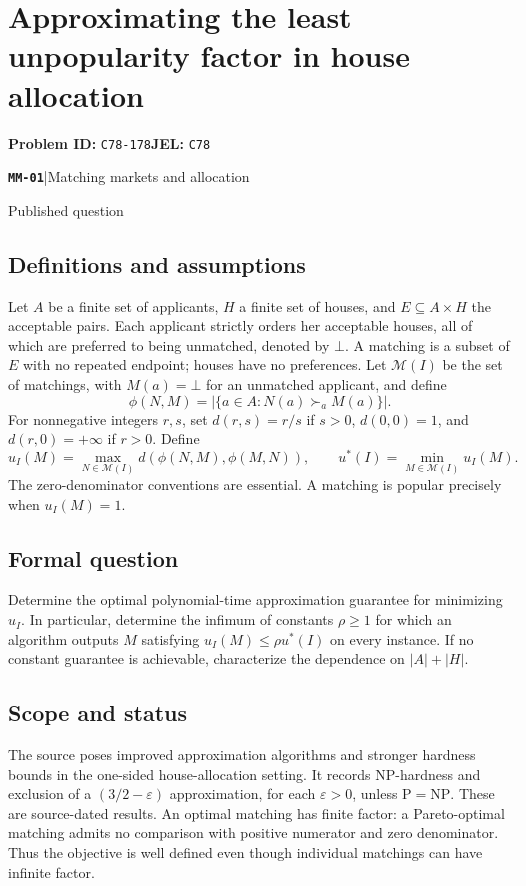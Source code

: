 \documentclass[11pt,a4paper]{article}
\newcommand{\entrymeta}[3]{{\sffamily\small\color{muted}\textbf{\texttt{#1}}\quad|\quad #2\par #3\par}}
\begin{document}
\section*{Approximating the least unpopularity factor in house allocation}
\textbf{Problem ID:} \texttt{C78-178}\quad \textbf{JEL:} \texttt{C78}\par
\label{problem:OP-0542}
\label{beyond:MM-01}
\entrymeta{MM-01}{Matching markets and allocation}{Published question}
\subsection*{Definitions and assumptions}
Let $A$ be a finite set of applicants, $H$ a finite set of houses, and $E\subseteq A\times H$ the acceptable pairs. Each applicant strictly orders her acceptable houses, all of which are preferred to being unmatched, denoted by $\bot$. A matching is a subset of $E$ with no repeated endpoint; houses have no preferences. Let $\mathcal M(I)$ be the set of matchings, with $M(a)=\bot$ for an unmatched applicant, and define
\[
 \phi(N,M)=|\{a\in A:N(a)\succ_a M(a)\}|.
\]
For nonnegative integers $r,s$, set $d(r,s)=r/s$ if $s>0$, $d(0,0)=1$, and $d(r,0)=+\infty$ if $r>0$. Define
\[
 u_I(M)=\max_{N\in\mathcal M(I)}d(\phi(N,M),\phi(M,N)),\qquad
 u^*(I)=\min_{M\in\mathcal M(I)}u_I(M).
\]
The zero-denominator conventions are essential. A matching is popular precisely when $u_I(M)=1$.
\subsection*{Formal question}
Determine the optimal polynomial-time approximation guarantee for minimizing $u_I$. In particular, determine the infimum of constants $\rho\ge1$ for which an algorithm outputs $M$ satisfying $u_I(M)\le\rho u^*(I)$ on every instance. If no constant guarantee is achievable, characterize the dependence on $|A|+|H|$.
\subsection*{Scope and status}
The source poses improved approximation algorithms and stronger hardness bounds in the one-sided house-allocation setting. It records NP-hardness and exclusion of a $(3/2-\varepsilon)$ approximation, for each $\varepsilon>0$, unless $\mathrm P=\mathrm{NP}$. These are source-dated results. An optimal matching has finite factor: a Pareto-optimal matching admits no comparison with positive numerator and zero denominator. Thus the objective is well defined even though individual matchings can have infinite factor.
\end{document}
